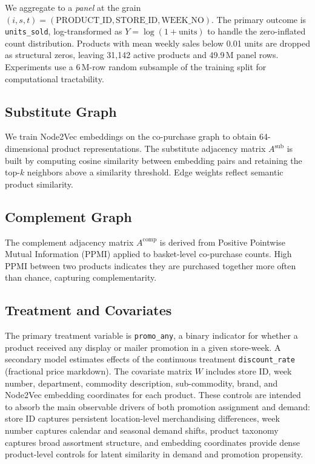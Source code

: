 \documentclass[conference]{IEEEtran}
\begin{document}
We aggregate to a \emph{panel} at the grain
$(i, s, t) = (\text{PRODUCT\_ID}, \text{STORE\_ID}, \text{WEEK\_NO})$.
The primary outcome is \texttt{units\_sold}, log-transformed as
$Y = \log(1 + \text{units})$ to handle the zero-inflated count
distribution.
Products with mean weekly sales below 0.01 units are dropped as structural
zeros, leaving 31,142 active products and 49.9\,M panel rows.
Experiments use a 6\,M-row random subsample of the training split for
computational tractability.

\subsection{Substitute Graph}

We train Node2Vec \cite{grover2016node2vec} embeddings on the
co-purchase graph to obtain 64-dimensional product representations.
The substitute adjacency matrix $A^{\mathrm{sub}}$ is built by computing
cosine similarity between embedding pairs and retaining the top-$k$
neighbors above a similarity threshold.
Edge weights reflect semantic product similarity.

\subsection{Complement Graph}

The complement adjacency matrix $A^{\mathrm{comp}}$ is derived from
Positive Pointwise Mutual Information (PPMI) \cite{church1990word}
applied to basket-level co-purchase counts.
High PPMI between two products indicates they are purchased together more
often than chance, capturing complementarity.

\subsection{Treatment and Covariates}

The primary treatment variable is \texttt{promo\_any}, a binary indicator
for whether a product received any display or mailer promotion in a given
store-week.
A secondary model estimates effects of the continuous treatment
\texttt{discount\_rate} (fractional price markdown).
The covariate matrix $W$ includes store ID, week number, department,
commodity description, sub-commodity, brand, and Node2Vec embedding
coordinates for each product.
These controls are intended to absorb the main observable drivers of both
promotion assignment and demand: store ID captures persistent
location-level merchandising differences, week number captures calendar and
seasonal demand shifts, product taxonomy captures broad assortment
structure, and embedding coordinates provide dense product-level controls
for latent similarity in demand and promotion propensity.
\end{document}
